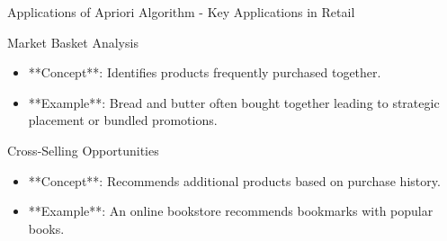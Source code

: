 \documentclass[aspectratio=169]{beamer}
\begin{document}
\begin{frame}[fragile]{Applications of Apriori Algorithm - Key Applications in Retail}
  \begin{block}{Market Basket Analysis}
    \begin{itemize}
      \item **Concept**: Identifies products frequently purchased together.
      \item **Example**: Bread and butter often bought together leading to strategic placement or bundled promotions.
    \end{itemize}
  \end{block}

  \begin{block}{Cross-Selling Opportunities}
    \begin{itemize}
      \item **Concept**: Recommends additional products based on purchase history.
      \item **Example**: An online bookstore recommends bookmarks with popular books.
    \end{itemize}
  \end{block}
\end{frame}
\end{document}
